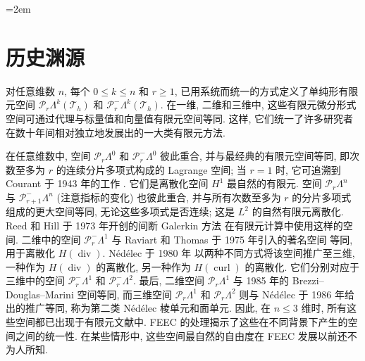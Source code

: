 \endgroup
\begingroup\emergencystretch=2em
\section{{历史渊源}}\label{sec:historical-antecedents}

{对任意维数 $n$, 每个 $0\leq k\leq n$ 和 $r\geq1$, 已用系统而统一的方式定义了单纯形有限元空间 $\mathcal P_r\Lambda^k(\mathcal T_h)$ 和 $\mathcal P_r^-\Lambda^k(\mathcal T_h)$. 在一维, 二维和三维中, 这些有限元微分形式空间可通过代理与标量值和向量值有限元空间等同. 这样, 它们统一了许多研究者在数十年间相对独立地发展出的一大类有限元方法.}

{在任意维数中, 空间 $\mathcal P_r\Lambda^0$ 和 $\mathcal P_r^-\Lambda^0$ 彼此重合, 并与最经典的有限元空间等同, 即次数至多为 $r$ 的连续分片多项式构成的 Lagrange 空间; 当 $r=1$ 时, 它可追溯到 Courant 于 1943 年的工作 . 它们是离散化空间 $H^1$ 最自然的有限元. 空间 $\mathcal P_r\Lambda^n$ 与 $\mathcal P_{r+1}^-\Lambda^n$ (注意指标的变化) 也彼此重合, 并与所有次数至多为 $r$ 的分片多项式组成的更大空间等同, 无论这些多项式是否连续; 这是 $L^2$ 的自然有限元离散化. Reed 和 Hill 于 1973 年开创的间断 Galerkin 方法  在有限元计算中使用这样的空间. 二维中的空间 $\mathcal P_r^-\Lambda^1$ 与 Raviart 和 Thomas 于 1975 年引入的著名空间  等同, 用于离散化 $H(\operatorname{div})$. Nédélec 于 1980 年  以两种不同方式将该空间推广至三维, 一种作为 $H(\operatorname{div})$ 的离散化, 另一种作为 $H(\operatorname{curl})$ 的离散化. 它们分别对应于三维中的空间 $\mathcal P_r^-\Lambda^1$ 和 $\mathcal P_r^-\Lambda^2$. 最后, 二维空间 $\mathcal P_r\Lambda^1$ 与 1985 年的 Brezzi–Douglas–Marini 空间等同, 而三维空间 $\mathcal P_r\Lambda^1$ 和 $\mathcal P_r\Lambda^2$ 则与 Nédélec 于 1986 年给出的推广等同, 称为第二类 Nédélec 棱单元和面单元. 因此, 在 $n\leq3$ 维时, 所有这些空间都已出现于有限元文献中. FEEC 的处理揭示了这些在不同背景下产生的空间之间的统一性. 在某些情形中, 这些空间最自然的自由度在 FEEC 发展以前还不为人所知.}

